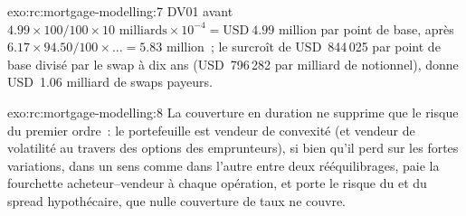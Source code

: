 \begin{solution}{exo:rc:mortgage-modelling:7}
DV01 avant $4.99\times100/100\times10\text{ milliards}\times10^{-4} = \text{USD}~4.99$ million par
point de base, après $6.17\times94.50/100\times\ldots = 5.83$ million~; le surcroît de USD~844\,025 par
point de base divisé par le swap à dix ans (USD~796\,282 par milliard de notionnel), donne USD~1.06 milliard de
swaps payeurs.
\end{solution}

\begin{solution}{exo:rc:mortgage-modelling:8}
La couverture en duration ne supprime que le risque du premier ordre~: le portefeuille est vendeur de convexité (et vendeur de
volatilité au travers des options des emprunteurs), si bien qu'il perd sur les fortes variations, dans un sens comme dans l'autre
entre deux rééquilibrages, paie la fourchette acheteur--vendeur à chaque opération, et porte le risque du  et
du spread hypothécaire, que nulle couverture de taux ne couvre.
\end{solution}

